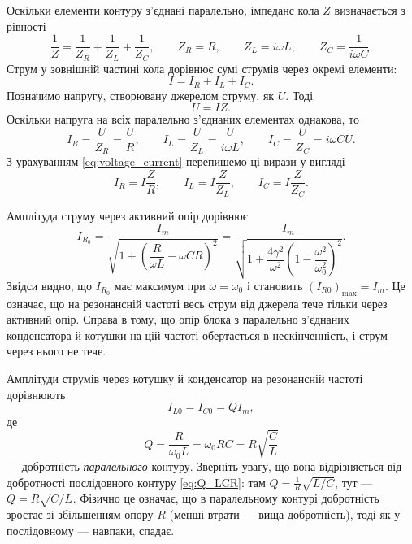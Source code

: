 Оскільки елементи контуру з'єднані паралельно, імпеданс кола $Z$ визначається з рівності
\begin{equation}\label{eq:parallel_impedance}
	\frac{1}{Z} = \frac{1}{Z_R} + \frac{1}{Z_L} + \frac{1}{Z_C}, \qquad
	Z_R = R, \qquad Z_L = i\omega L, \qquad Z_C = \frac{1}{i\omega C}.
\end{equation}
Струм у зовнішній частині кола дорівнює сумі струмів через окремі елементи:
\begin{equation}\label{eq:current_sum}
	I = I_R + I_L + I_C.
\end{equation}
Позначимо напругу, створювану джерелом струму, як $U$. Тоді
\begin{equation}\label{eq:voltage_current}
	U = IZ.
\end{equation}
Оскільки напруга на всіх паралельно з'єднаних елементах однакова, то
\begin{equation}\label{eq:branch_currents}
	I_R = \frac{U}{Z_R} = \frac{U}{R}, \qquad
	I_L = \frac{U}{Z_L} = \frac{U}{i\omega L}, \qquad
	I_C = \frac{U}{Z_C} = i\omega C U.
\end{equation}
З урахуванням \eqref{eq:voltage_current} перепишемо ці вирази у вигляді
\begin{equation}\label{eq:branch_currents_Z}
	I_R = I\frac{Z}{R}, \qquad
	I_L = I\frac{Z}{Z_L}, \qquad
	I_C = I\frac{Z}{Z_C}.
\end{equation}

Амплітуда струму через активний опір дорівнює
\begin{equation}\label{eq:IR_amplitude}
	I_{R_0} = \frac{I_m}{\sqrt{1 + \left(\dfrac{R}{\omega L} - \omega C R\right)^2}}
	= \frac{I_m}{\sqrt{1 + \dfrac{4\gamma^2}{\omega^2}\left(1 - \dfrac{\omega^2}{\omega_0^2}\right)^2}}.
\end{equation}
Звідси видно, що $I_{R_0}$ має максимум при $\omega = \omega_0$ і становить $(I_{R0})_{\max} = I_m$. Це означає, що на резонансній частоті весь струм від джерела тече тільки через активний опір. Справа в тому, що опір блока з паралельно з'єднаних конденсатора й котушки на цій частоті обертається в нескінченність, і струм через нього не тече.

Амплітуди струмів через котушку й конденсатор на резонансній частоті дорівнюють
\begin{equation}\label{eq:resonance_currents_Q}
	I_{L0} = I_{C0} = QI_m,
\end{equation}
де
\begin{equation}\label{eq:Q_parallel}
	Q = \frac{R}{\omega_0 L} = \omega_0 R C = R\sqrt{\frac{C}{L}}
\end{equation}
--- добротність \emph{паралельного} контуру. Зверніть увагу, що вона відрізняється від добротності послідовного контуру \eqref{eq:Q_LCR}: там $Q = \frac{1}{R}\sqrt{L/C}$, тут --- $Q = R\sqrt{C/L}$. Фізично це означає, що в паралельному контурі добротність зростає зі збільшенням опору $R$ (менші втрати --- вища добротність), тоді як у послідовному --- навпаки, спадає.

